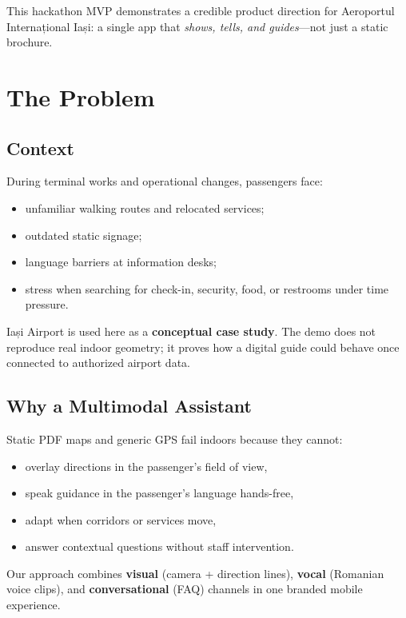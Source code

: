 \documentclass[11pt,a4paper]{article}
\begin{document}
This hackathon MVP demonstrates a credible product direction for Aeroportul Internațional Iași: a single app that \emph{shows, tells, and guides}---not just a static brochure.

\section{The Problem}

\subsection{Context}

During terminal works and operational changes, passengers face:

\begin{itemize}
    \item unfamiliar walking routes and relocated services;
    \item outdated static signage;
    \item language barriers at information desks;
    \item stress when searching for check-in, security, food, or restrooms under time pressure.
\end{itemize}

Iași Airport is used here as a \textbf{conceptual case study}. The demo does not reproduce real indoor geometry; it proves how a digital guide could behave once connected to authorized airport data.

\subsection{Why a Multimodal Assistant}

Static PDF maps and generic GPS fail indoors because they cannot:

\begin{itemize}
    \item overlay directions in the passenger's field of view,
    \item speak guidance in the passenger's language hands-free,
    \item adapt when corridors or services move,
    \item answer contextual questions without staff intervention.
\end{itemize}

Our approach combines \textbf{visual} (camera + direction lines), \textbf{vocal} (Romanian voice clips), and \textbf{conversational} (FAQ) channels in one branded mobile experience.
\end{document}
